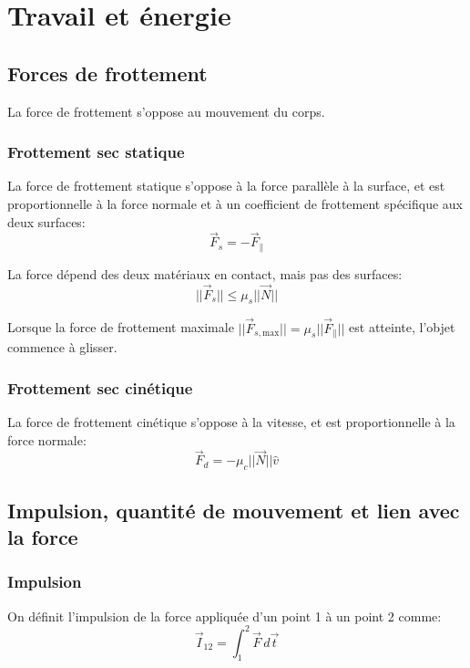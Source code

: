 \documentclass{article}
\numberwithin{equation}{section}
\begin{document}


\section{Travail et énergie}

\subsection{Forces de frottement}
La force de frottement s'oppose au mouvement du corps.

\subsubsection{Frottement sec statique}
La force de frottement statique s'oppose à la force parallèle à la surface, et est proportionnelle à la force normale et à un coefficient de frottement spécifique aux deux surfaces:
\begin{equation*}
	\vec F_s = - \vec F_\parallel
\end{equation*}

La force dépend des deux matériaux en contact, mais pas des surfaces:
\begin{equation}
	\boxed{ ||\vec F_s|| \leq \mu_s||\vec N|| }
\end{equation}

Lorsque la force de frottement maximale \( || \vec F_{s, \text{max}} || = \mu_s || \vec F_\parallel ||\) est atteinte, l'objet commence à glisser. 

\subsubsection{Frottement sec cinétique}
La force de frottement cinétique s'oppose à la vitesse, et est proportionnelle à la force normale:
\begin{equation}
	\boxed{ \vec F_d = - \mu_c ||\vec N|| \hat v }
\end{equation}

\subsection{Impulsion, quantité de mouvement et lien avec la force}

\subsubsection{Impulsion}
On définit l'impulsion de la force appliquée d'un point 1 à un point 2 comme:
\begin{equation}
	\boxed{ \vec I_{12} = \int_1^2 \vec F \, d \vec t }
\end{equation}
\end{document}
